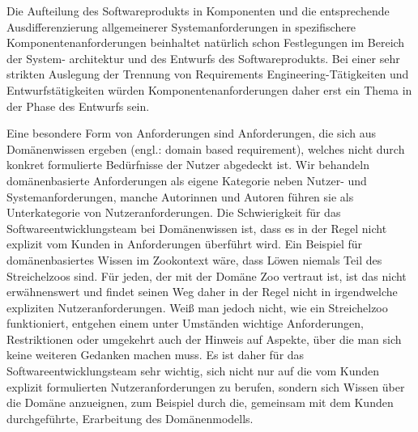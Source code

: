 Die Aufteilung des Softwareprodukts in Komponenten und die entsprechende Ausdifferenzierung allgemeinerer Systemanforderungen in spezifischere Komponenten\-anforderungen beinhaltet natürlich schon Festlegungen im Bereich der System-
\linebreak
architektur und des Entwurfs des Softwareprodukts. Bei einer sehr strikten Auslegung der Trennung von Requirements Engineering-Tätigkeiten und Entwurfstätigkeiten würden Komponentenanforderungen daher erst ein Thema in der Phase des Entwurfs sein.


Eine besondere Form von Anforderungen sind Anforderungen, die sich aus Domänen\-wissen ergeben (engl.: domain based requirement), welches nicht durch konkret formulierte Bedürfnisse der Nutzer abgedeckt ist. Wir behandeln domänenbasierte 
\linebreak %
Anforderungen als eigene Kategorie neben Nutzer- und Systemanforderungen, manche Autorinnen und Autoren führen sie als Unterkategorie von Nutzeranforderungen. Die Schwierigkeit für das Softwareentwicklungsteam bei Domänenwissen ist, dass es in der Regel nicht explizit vom Kunden in Anforderungen überführt wird. Ein Beispiel für domänenbasiertes Wissen im Zookontext wäre, dass Löwen niemals Teil des Streichelzoos sind. Für jeden, der mit der Domäne Zoo vertraut ist, ist das nicht erwähnenswert und findet seinen Weg daher in der Regel nicht in irgendwelche expliziten Nutzeranforderungen. Weiß man jedoch nicht, wie ein Streichelzoo funktioniert, entgehen einem unter Umständen wichtige Anforderungen, Restriktionen oder umgekehrt auch der Hinweis auf Aspekte, über die man sich keine weiteren Gedanken machen muss. Es ist daher für das Softwareentwicklungsteam sehr wichtig, sich nicht nur auf die vom Kunden explizit formulierten Nutzeranforderungen zu berufen, sondern sich Wissen über die Domäne anzueignen, zum Beispiel durch die, gemeinsam mit dem Kunden durchgeführte, Erarbeitung des Domänenmodells.


